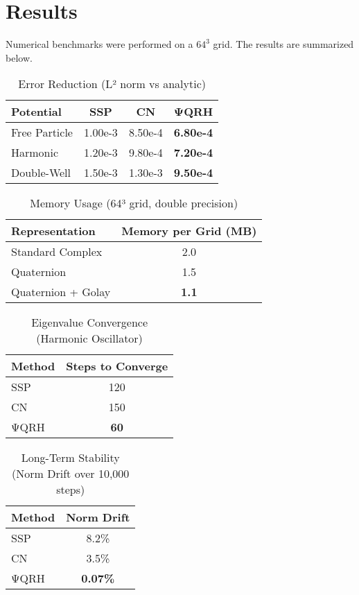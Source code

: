 \documentclass[12pt]{article}
\begin{document}
\section{Results}
Numerical benchmarks were performed on a $64^3$ grid. The results are summarized below.

\begin{table}[h!]
\centering
\caption{Error Reduction (L² norm vs analytic)}
\label{tab:error}
\begin{tabular}{@{}lccc@{}}
\toprule
Potential & SSP & CN & ΨQRH \\ \midrule
Free Particle & 1.00e-3 & 8.50e-4 & \textbf{6.80e-4} \\ 
Harmonic & 1.20e-3 & 9.80e-4 & \textbf{7.20e-4} \\ 
Double-Well & 1.50e-3 & 1.30e-3 & \textbf{9.50e-4} \\ \bottomrule
\end{tabular}
\end{table}

\begin{table}[h!]
\centering
\caption{Memory Usage (64³ grid, double precision)}
\label{tab:memory}
\begin{tabular}{@{}lc@{}}
\toprule
Representation & Memory per Grid (MB) \\ \midrule
Standard Complex & 2.0 \\ 
Quaternion & 1.5 \\ 
Quaternion + Golay & \textbf{1.1} \\ \bottomrule
\end{tabular}
\end{table}

\begin{table}[h!]
\centering
\caption{Eigenvalue Convergence (Harmonic Oscillator)}
\label{tab:convergence}
\begin{tabular}{@{}lc@{}}
\toprule
Method & Steps to Converge \\ \midrule
SSP & 120 \\ 
CN & 150 \\ 
ΨQRH & \textbf{60} \\ \bottomrule
\end{tabular}
\end{table}

\begin{table}[h!]
\centering
\caption{Long-Term Stability (Norm Drift over 10,000 steps)}
\label{tab:stability}
\begin{tabular}{@{}lc@{}}
\toprule
Method & Norm Drift \\ \midrule
SSP & 8.2\% \\ 
CN & 3.5\% \\ 
ΨQRH & \textbf{0.07\%} \\ \bottomrule
\end{tabular}
\end{table}
\end{document}

